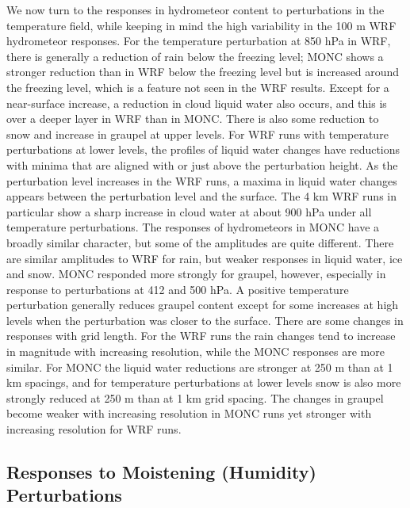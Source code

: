 \documentclass[draft]{agujournal2019}
\begin{document}
We now turn to the responses in hydrometeor content to perturbations in the
temperature field, while keeping in mind the high variability in the 100 m WRF
hydrometeor responses. For the temperature perturbation at 850 hPa in WRF, there
is generally a reduction of rain below the freezing level; MONC shows a stronger
reduction than in WRF below the freezing level but is increased around the
freezing level, which is a feature not seen in the WRF results. Except for a
near-surface increase, a reduction in cloud liquid water also occurs, and this
is over a deeper layer in WRF than in MONC. There is also some reduction to snow
and increase in graupel at upper levels. For WRF runs with temperature
perturbations at lower levels, the profiles of liquid water changes have
reductions with minima that are aligned with or just above the perturbation
height. As the perturbation level increases in the WRF runs, a maxima in liquid
water changes appears between the perturbation level and the surface. The 4 km
WRF runs in particular show a sharp increase in cloud water at about 900 hPa
under all temperature perturbations. The responses of hydrometeors in MONC have
a broadly similar character, but some of the amplitudes are quite different.
There are similar amplitudes to WRF for rain, but weaker responses in liquid
water, ice and snow. MONC responded more strongly for graupel, however,
especially in response to perturbations at 412 and 500 hPa. A positive
temperature perturbation generally reduces graupel content except for some
increases at high levels when the perturbation was closer to the surface. There
are some changes in responses with grid length. For the WRF runs the rain
changes tend to increase in magnitude with increasing resolution, while the MONC
responses are more similar. For MONC the liquid water reductions are stronger at
250 m than at 1 km spacings, and for temperature perturbations at lower levels
snow is also more strongly reduced at 250 m than at 1 km grid spacing. The
changes in graupel become weaker with increasing resolution in MONC runs yet
stronger with increasing resolution for WRF runs. 

\subsection{Responses to Moistening (Humidity) Perturbations}
\end{document}
